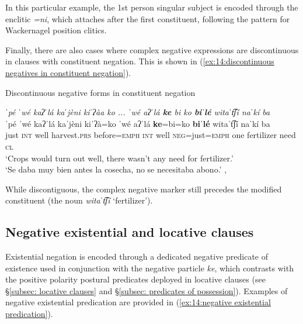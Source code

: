 \z

In this particular example, the 1st person singular subject is encoded through the enclitic \textit{=ni}, which attaches after the first constituent, following the pattern for Wackernagel position clitics.

Finally, there are also cases where complex negative expressions are discontinuous in clauses with constituent negation. This is shown in (\ref{ex:14:discontinuous negatives in constituent negation}).

\ea\label{ex:14:discontinuous negatives in constituent negation}
{Discontinuous negative forms in constituent negation}

        \textit{ˈpé ˈwé kaʔˈlá kaˈjèni kiˈʔàa ko ... ˈwé aʔˈlá \textbf{ke} bi ko \textbf{biˈlé} witaˈt͡ʃí naˈkí ba}\\
        \gll    ˈpé ˈwé kaʔˈlá kaˈjèni kiˈʔà=ko ˈwé aʔˈlá \textbf{ke}=bi=ko \textbf{biˈlé} witaˈt͡ʃí naˈkí  ba\\
                just \textsc{int} well harvest.\textsc{prs} before=\textsc{emph} \textsc{int}  well {\textsc{neg}}=just=\textsc{emph} {one} fertilizer need \textsc{cl}  \\
        \glt    `Crops would turn out well, there wasn’t any need for fertilizer.'\\
        \glt    `Se daba muy bien antes la cosecha, no se necesitaba abono.'  , \\

\z

While discontiguous, the complex negative marker still precedes the modified constituent (the noun \textit{witaˈt͡ʃí} `fertilizer').

\subsection{Negative existential and locative clauses}
\label{subsec: negative existence and legative locative clauses}

Existential negation is encoded through a dedicated negative predicate of existence used in conjunction with the negative particle \textit{ke}, which contrasts with the positive polarity postural predicates deployed in locative clauses (see §\ref{subsec: locative clauses} and §\ref{subsec: predicates of possession}). Examples of negative existential predication are provided in (\ref{ex:14:negative existential predication}).

